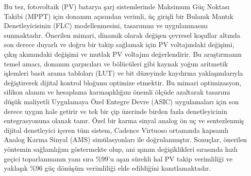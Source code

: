 \documentclass[a4paper,oneside,12pt]{report}
\numberwithin{equation}{chapter}
\begin{document}
\begin{ozet}
Bu tez, fotovoltaik (PV) batarya şarj sistemlerinde Maksimum Güç Noktası Takibi (MPPT) için donanım açısından verimli, üç girişli bir Bulanık Mantık Denetleyicisinin (FLC) modellenmesini, tasarımını ve uygulanmasını sunmaktadır. Önerilen mimari, dinamik olarak değişen çevresel koşullar altında son derece duyarlı ve doğru bir takip sağlamak için PV voltajındaki değişimi, çıkış akımındaki değişimi ve mutlak PV voltajını değerlendirir. Bu araştırmanın temel amacı, donanım çarpıcıları ve bölücüleri gibi kaynak yoğun aritmetik işlemleri basit arama tabloları (LUT) ve bit düzeyinde kaydırma yaklaşımlarıyla değiştirerek dijital kontrol bloğunu optimize etmektir. Bu mimari optimizasyon, silikon alanını ve hesaplama karmaşıklığını önemli ölçüde azaltarak tasarımı düşük maliyetli Uygulamaya Özel Entegre Devre (ASIC) uygulamaları için son derece uygun hale getirir ve tek bir çip üzerinde birden fazla denetleyicinin entegrasyonuna olanak tanır. Özel bir karma sinyal analog ön uç ve sentezlenmiş dijital denetleyici içeren tüm sistem, Cadence Virtuoso ortamında kapsamlı Analog Karma Sinyal (AMS) simülasyonları ile doğrulanmıştır. Sonuçlar, önerilen yöntemin sağlamlığını göstermekte olup, ani ışınım değişiklikleri sırasında hızlı geçici toparlanmanın yanı sıra \%99'u aşan sürekli hal PV takip verimliliği ve yaklaşık \%96 güç dönüşüm verimliliği elde edildiğini kanıtlamaktadır.
\end{ozet}

\tableofcontents
\listoffigures
\listoftables
\lstlistoflistings

\begin{symbols}
\sym{}{}
\sym{ }{}
\end{symbols}
\end{document}
